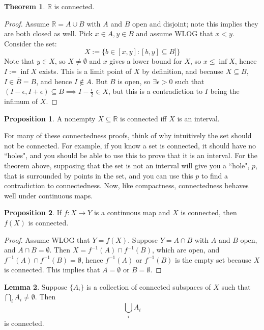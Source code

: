 \documentclass[11pt, oneside]{amsart}   	%
\theoremstyle{definition}
\newtheorem{theorem}{Theorem}[section]
\newtheorem{lemma}[theorem]{Lemma}
\newtheorem{prop}{Proposition}[section]
\begin{document}
	\begin{theorem}
		$\mathbb R$ is connected.
	\end{theorem}
	
	\begin{proof}
		Assume $\mathbb R = A\cup B$ with $A$ and $B$ open and disjoint; note this implies they are both closed as well. Pick $x\in A, y\in B$ and assume 
		WLOG that $x < y$. Consider the set:
		$$
			X := \{b\in [x, y]: [b, y]\subseteq B]\}
		$$
		Note that $y\in X$, so $X\neq\emptyset$ and $x$ gives a lower bound for $X$, so $x\leq\inf X$, hence $I := \inf X$ 
		exists. This is a limit point of $X$ by definition, and because $X\subseteq B$, $I\in\overline B = B$, and hence $I
		\notin A$. But $B$ is open, so $\exists\epsilon > 0$ such that $(I - \epsilon, I + \epsilon)\subseteq B\implies I-
		\frac{\epsilon}{2}\in X$, but this is a contradiction to $I$ being the infimum of $X$.
	\end{proof}
	
	\begin{prop}
		A nonempty $X\subseteq\mathbb R$ is connected iff $X$ is an interval.
	\end{prop}
	
	For many of these connectedness proofs, think of why intuitively the set should not be connected. For example, if you 
	know a set is connected, it should have no ``holes", and you should be able to use this to prove that it is an interval. For 
	the theorem above, supposing that the set is not an interval will give you a ``hole", $p$, that is surrounded by points in 
	the set, and you can use this $p$ to find a contradiction to connectedness. Now, like compactness, connectedness 
	behaves well under continuous maps.
	
	\begin{prop}
		If $f : X\rightarrow Y$ is a continuous map and $X$ is connected, then $f(X)$ is connected.
	\end{prop}
	
	\begin{proof}
		Assume WLOG that $Y = f(X)$. Suppose $Y = A\cap B$ with $A$ and $B$ open, and $A\cap B = \emptyset$. Then $X = f^{-1}(A)\cap f^{-1}(B)$, which 
		are open, and $f^{-1}(A)\cap f^{-1}(B) = \emptyset$, hence $f^{-1}(A)$ or $f^{-1}(B)$ is the empty set because $X$ is connected. This implies that 
		$A = \emptyset$ or $B = \emptyset$. 
	\end{proof}
	
	\begin{lemma}
		Suppose $\{A_i\}$ is a collection of connected subspaces of $X$ such that $\bigcap_i A_i\neq\emptyset$. Then 
		$$
			\bigcup_i A_i
		$$
		is connected.
	\end{lemma}
	
\end{document}

